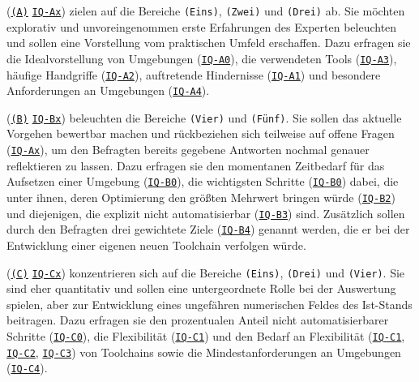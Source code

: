 \textbf{} (\texttt{\hyperref[subsubsec:04-01-02-02_form]{(A)}} \textrightarrow \texttt{\hyperref[subsec:AA-01-01_open-questions]{IQ-Ax}}) zielen auf die Bereiche \texttt{(Eins)}, \texttt{(Zwei)} und \texttt{(Drei)} ab. Sie möchten explorativ und unvoreingenommen erste Erfahrungen des Experten beleuchten und sollen eine Vorstellung vom praktischen Umfeld erschaffen. Dazu erfragen sie die Idealvorstellung von Umgebungen (\texttt{\hyperref[subsec:AA-01-01_open-questions]{IQ-A0}}), die verwendeten Tools (\texttt{\hyperref[subsec:AA-01-01_open-questions]{IQ-A3}}), häufige Handgriffe (\texttt{\hyperref[subsec:AA-01-01_open-questions]{IQ-A2}}), auftretende Hindernisse (\texttt{\hyperref[subsec:AA-01-01_open-questions]{IQ-A1}}) und besondere Anforderungen an Umgebungen (\texttt{\hyperref[subsec:AA-01-01_open-questions]{IQ-A4}}).

\textbf{} (\texttt{\hyperref[subsubsec:04-01-02-02_form]{(B)}} \textrightarrow \texttt{\hyperref[subsec:AA-01-02_half-open-questions]{IQ-Bx}}) beleuchten die Bereiche \texttt{(Vier)} und \texttt{(Fünf)}. Sie sollen das aktuelle Vorgehen bewertbar machen und rückbeziehen sich teilweise auf offene Fragen (\texttt{\hyperref[subsec:AA-01-01_open-questions]{IQ-Ax}}), um den Befragten bereits gegebene Antworten nochmal genauer reflektieren zu lassen. Dazu erfragen sie den momentanen Zeitbedarf für das Aufsetzen einer Umgebung (\texttt{\hyperref[subsec:AA-01-02_half-open-questions]{IQ-B0}}), die wichtigsten Schritte (\texttt{\hyperref[subsec:AA-01-02_half-open-questions]{IQ-B0}}) dabei, die unter ihnen, deren Optimierung den größten Mehrwert bringen würde (\texttt{\hyperref[subsec:AA-01-02_half-open-questions]{IQ-B2}}) und diejenigen, die explizit nicht automatisierbar (\texttt{\hyperref[subsec:AA-01-02_half-open-questions]{IQ-B3}}) sind. Zusätzlich sollen durch den Befragten drei gewichtete Ziele (\texttt{\hyperref[subsec:AA-01-02_half-open-questions]{IQ-B4}}) genannt werden, die er bei der Entwicklung einer eigenen neuen Toolchain verfolgen würde.

\textbf{} (\texttt{\hyperref[subsubsec:04-01-02-02_form]{(C)}} \textrightarrow \texttt{\hyperref[subsec:AA-01-03_closed-questions]{IQ-Cx}}) konzentrieren sich auf die Bereiche \texttt{(Eins)}, \texttt{(Drei)} und \texttt{(Vier)}. Sie sind eher quantitativ und sollen eine untergeordnete Rolle bei der Auswertung spielen, aber zur Entwicklung eines ungefähren numerischen Feldes des Ist-Stands beitragen. Dazu erfragen sie den prozentualen Anteil nicht automatisierbarer Schritte (\texttt{\hyperref[subsec:AA-01-03_closed-questions]{IQ-C0}}), die Flexibilität (\texttt{\hyperref[subsec:AA-01-03_closed-questions]{IQ-C1}}) und den Bedarf an Flexibilität (\texttt{\hyperref[subsec:AA-01-03_closed-questions]{IQ-C1}}, \texttt{\hyperref[subsec:AA-01-03_closed-questions]{IQ-C2}}, \texttt{\hyperref[subsec:AA-01-03_closed-questions]{IQ-C3}}) von Toolchains sowie die Mindestanforderungen an Umgebungen (\texttt{\hyperref[subsec:AA-01-03_closed-questions]{IQ-C4}}).


